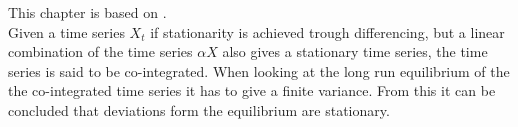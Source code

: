  
This chapter is based on \cite{co-Integration_and_error_correction}.
\\
Given a time series $X_t$ if stationarity is achieved trough differencing, but a linear combination of the time series $\alpha X$ also gives a stationary time series, the time series is said to be co-integrated. When looking at the long run equilibrium of the the co-integrated time series it has to give a finite variance. From this it can be concluded that deviations form the equilibrium are stationary.
